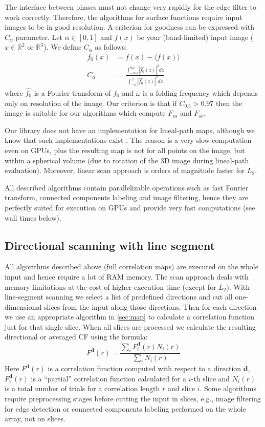 \documentclass[reprint,amsmath,amssymb,aps,pre,showkeys,showpacs,nofootinbib]{revtex4-1}
\begin{document}
The interface between phases must not change very rapidly for the edge filter to
work correctly. Therefore, the algorithms for surface functions require input
images to be in good resolution. A criterion for goodness can be expressed with
$C_{\alpha}$ parameter. Let $\alpha \in [0, 1]$ and $f(x)$ be your
(band-limited) input image ($x \in \mathbb{R}^2$ or $\mathbb{R}^3$). We define
$C_\alpha$ as follows:
\begin{align*}
  f_0(x) &= f(x) - \langle f(x) \rangle \\
  C_\alpha &= \frac{\int_{-\alpha\omega}^{\alpha\omega} |\hat{f_0}(z)|^2
    dz}{\int_{-\omega}^{\omega} |\hat{f_0}(z)|^2 dz}
\end{align*}
where $\hat{f_0}$ is a Fourier transform of $f_0$ and $\omega$ is a folding
frequency which depends only on resolution of the image. Our criterion is that
if $C_{0.5} > 0.97$ then the image is suitable for our algorithms which compute
$F_{ss}$ and $F_{sv}$.

Our library does not have an implementation for lineal-path maps, although we
know that such implementations exist \cite{havelkafast}. The reason is a very
slow computation even on GPUs, plus the resulting map is not for all points on
the image, but within a spherical volume (due to rotation of the 3D image during
lineal-path evaluation). Moreover, linear scan approach is orders of magnitude
faster for $L_2$.

All described algorithms contain parallelizable operations such as fast Fourier
transform, connected components labeling and image filtering, hence they are
perfectly suited for execution on GPUs and provide very fast computations (see
wall times below).

\subsection{Directional scanning with line segment}
\label{sec:scan}
All algorithms described above (full correlation maps) are executed on the whole
input and hence require a lot of RAM memory. The scan approach deals with memory
limitations at the cost of higher execution time (except for $L_2$). With
line-segment scanning we select a list of predefined directions and cut all
one-dimensional slices from the input along those directions. Then for each
direction we use an appropriate algorithm in \cref{sec:map} to calculate a
correlation function just for that single slice. When all slices are processed
we calculate the resulting directional or averaged CF using the formula:
\begin{equation*}
  F^{\bm{d}}(r) = \frac{\sum\limits_i F^{\bm{d}}_i(r) N_i(r)}{\sum\limits_i N_i(r)}
\end{equation*}
Here $F^{\bm{d}}(r)$ is a correlation function computed with respect to a
direction $\bm{d}$, $F^{\bm{d}}_i(r)$ is a ``partial'' correlation
function calculated for a $i$-th slice and $N_i(r)$ is a total number of trials
for a correlation length $r$ and slice $i$. Some algorithms require
preprocessing stages before cutting the input in slices, e.g., image filtering
for edge detection or connected components labeling performed on the whole
array, not on slices.
\end{document}
